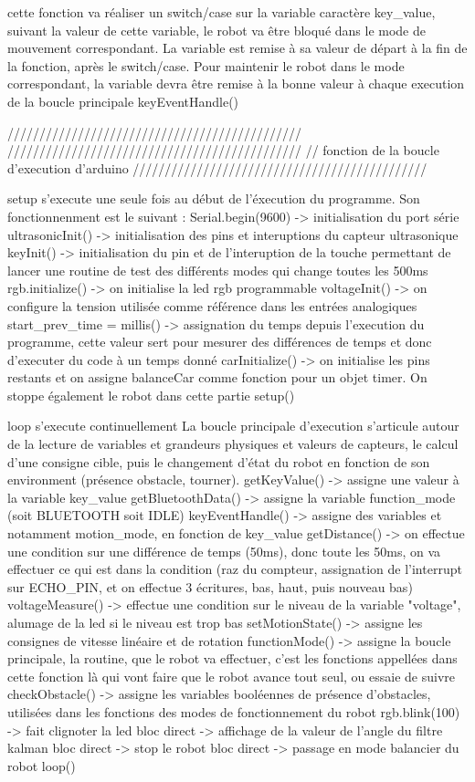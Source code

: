 cette fonction va réaliser un switch/case sur la variable caractère key_value, suivant la valeur
de cette variable, le robot va être bloqué dans le mode de mouvement correspondant. La variable
est remise à sa valeur de départ à la fin de la fonction, après le switch/case.
Pour maintenir le robot dans le mode correspondant, la variable devra être remise à la bonne valeur
à chaque execution de la boucle principale
keyEventHandle()

//////////////////////////////////////////////
//////////////////////////////////////////////
// fonction de la boucle d'execution d'arduino
//////////////////////////////////////////////

setup s'execute une seule fois au début de l'éxecution du programme.
Son fonctionnenment est le suivant : 
Serial.begin(9600) -> initialisation du port série 
ultrasonicInit() -> initialisation des pins et
interuptions du capteur ultrasonique 
keyInit() -> initialisation du pin et de l'interuption de la touche
permettant de lancer une routine de test des différents modes
 qui change toutes les 500ms
rgb.initialize() -> on initialise la led rgb programmable 
voltageInit() -> on configure la tension utilisée comme référence dans les
entrées analogiques
start_prev_time = millis() -> assignation du temps depuis l'execution du programme,
cette valeur sert pour mesurer des différences de temps et donc d'executer
du code à un temps donné
carInitialize() -> on initialise les pins restants et on assigne balanceCar comme 
fonction pour un objet timer. On stoppe également le robot dans  cette partie
setup()

loop s'execute continuellement
La boucle principale d'execution s'articule autour de la lecture de variables et grandeurs physiques
et valeurs de capteurs, le calcul d'une consigne cible, puis le changement d'état du robot en fonction
de son environment (présence obstacle, tourner).
getKeyValue() -> assigne une valeur à la variable key_value
getBluetoothData() -> assigne la variable function_mode (soit BLUETOOTH soit IDLE)
keyEventHandle() -> assigne des variables et notamment motion_mode, en fonction de key_value
getDistance() -> on effectue une condition sur une différence de temps (50ms),
donc toute les 50ms, on va effectuer ce qui est dans la condition
(raz du compteur, assignation de l'interrupt sur ECHO_PIN, et on effectue 3 
écritures, bas, haut, puis nouveau bas)
voltageMeasure() -> effectue une condition sur le niveau de la variable "voltage", alumage de la led
si le niveau est trop bas
setMotionState() -> assigne les consignes de vitesse linéaire et de rotation
functionMode() -> assigne la boucle principale, la routine, que le robot
va effectuer, c'est les fonctions appellées dans cette fonction là qui vont 
faire que le robot avance tout seul, ou essaie de suivre
checkObstacle() -> assigne les variables booléennes de présence d'obstacles, 
utilisées dans les fonctions des modes de fonctionnement du robot
rgb.blink(100) -> fait clignoter la led
bloc direct -> affichage de la valeur de l'angle du filtre kalman
bloc direct -> stop le robot
bloc direct -> passage en mode balancier du robot
loop()

